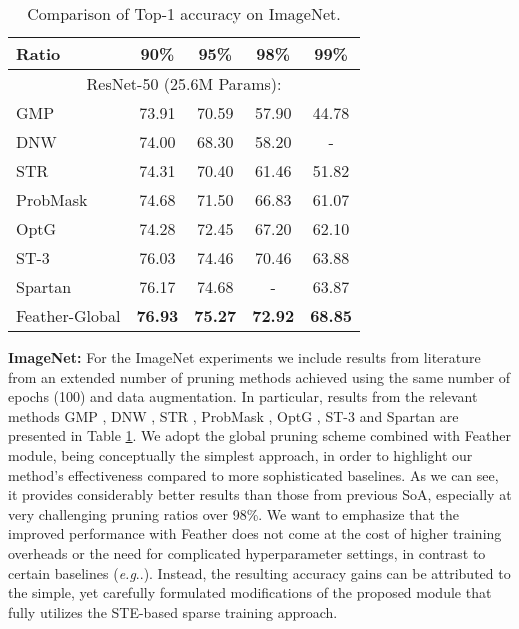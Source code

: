 \documentclass{article}
\makeatletter
\DeclareRobustCommand\onedot{\futurelet\@let@token\@onedot}
\def\@onedot{\ifx\@let@token.\else.\null\fi\xspace}
\def\eg{\emph{e.g}\onedot}
\makeatother
\begin{document}
\begin{table}
\centering
\begin{tabular}{lcccc}
\toprule
Ratio & 90\% & 95\% & 98\% & 99\%  \\
\midrule\midrule
\multicolumn{5}{c}{ResNet-50 (25.6M Params): }  \\ \midrule
GMP      \cite{zhu2017prune} 		        & 73.91  & 70.59  & 57.90 & 44.78 \\
DNW		 \cite{wortsman2019discovering}	    & 74.00  & 68.30  & 58.20 & - 	  \\
STR      \cite{kusupati2020soft} 		    & 74.31  & 70.40  & 61.46 & 51.82 \\  
ProbMask \cite{zhou2021effective}  		    & 74.68  & 71.50  & 66.83 & 61.07 \\
OptG	 \cite{zhang2022optimizing}	        & 74.28  & 72.45  & 67.20 & 62.10 \\
ST-3     \cite{vanderschueren2023straight}  & 76.03  & 74.46  & 70.46 & 63.88 \\
Spartan  \cite{tai2022spartan} 		        & 76.17  & 74.68  &   -   & 63.87 \\ 
\hdashline
Feather-Global      & \textbf{76.93} & \textbf{75.27}   & \textbf{72.92}  & \textbf{68.85}   \\
\bottomrule
\end{tabular}
\vspace{10pt}
\caption{Comparison of Top-1 accuracy on ImageNet.}
\label{tab:results_imagenet}
\end{table}



\noindent \textbf{ImageNet:} 
\noindent For the ImageNet experiments we include results from literature from an extended number of pruning methods achieved using the same number of epochs (100) and data augmentation. In particular, results from the relevant methods GMP \cite{zhu2017prune}, DNW \cite{wortsman2019discovering}, STR \cite{kusupati2020soft}, ProbMask \cite{zhou2021effective},  OptG \cite{zhang2022optimizing}, ST-3 \cite{vanderschueren2023straight} and Spartan \cite{tai2022spartan} are presented in Table \ref{tab:results_imagenet}. We adopt the global pruning scheme combined with Feather module, being conceptually the simplest approach, in order to highlight our method's effectiveness compared to more sophisticated baselines. As we can see, it provides considerably better results than those from previous SoA, especially at very challenging pruning ratios over 98\%. We want to emphasize that the improved performance with Feather does not come at the cost of higher training overheads or the need for complicated hyperparameter settings, in contrast to certain baselines (\eg \cite{kusupati2020soft, zhou2021effective}). Instead, the resulting accuracy gains can be attributed to the simple, yet carefully formulated modifications of the proposed module that fully utilizes the STE-based sparse training approach.
\end{document}
